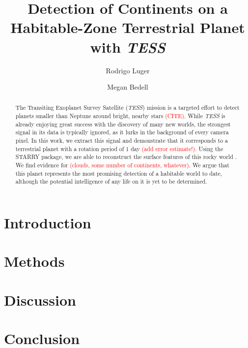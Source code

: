 \documentclass[modern]{aastex62}
\newcommand{\TESS}{\emph{TESS}\xspace}
\newcommand{\todo}[1]{\textcolor{red}{#1}}
\begin{document}
\title{Detection of Continents on a Habitable-Zone Terrestrial Planet with \TESS}

\author[0000-0002-0296-3826]{Rodrigo Luger}
%
\author[0000-0002-9328-5652]{Megan Bedell}

\begin{abstract}
The Transiting Exoplanet Survey Satellite (\TESS) mission is a targeted effort to detect planets smaller than Neptune around bright, nearby stars \todo{(CITE)}. 
While \TESS is already enjoying great success with the discovery of many new worlds, the strongest signal in its data is typically ignored, as it lurks in the background of every camera pixel. 
In this work, we extract this signal and demonstrate that it corresponds to a terrestrial planet with a rotation period of 1 day \todo{(add error estimate!)}. 
Using the STARRY package, we are able to reconstruct the surface features of this rocky world \citep{Luger2018}. 
We find evidence for \todo{(clouds, some number of continents, whatever)}. 
We argue that this planet represents the most promising detection of a habitable world to date, although the potential intelligence of any life on it is yet to be determined.
\end{abstract}


\section{Introduction}
\label{sec:intro}
%

\section{Methods}

\section{Discussion}

\section{Conclusion}

\pagebreak

\end{document}
